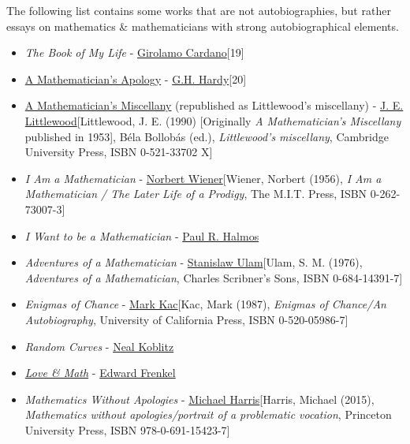 \documentclass{article}
\begin{document}
The following list contains some works that are not autobiographies, but rather essays on mathematics \& mathematicians with strong autobiographical elements.
\begin{itemize}
	\item \textit{The Book of My Life} - \href{https://en.wikipedia.org/wiki/Girolamo_Cardano}{Girolamo Cardano}[19]
	\item \href{https://en.wikipedia.org/wiki/A_Mathematician's_Apology}{A Mathematician's Apology} - \href{https://en.wikipedia.org/wiki/G.H._Hardy}{G.H. Hardy}[20]
	\item \href{https://en.wikipedia.org/wiki/A_Mathematician's_Miscellany}{A Mathematician's Miscellany} (republished as Littlewood's miscellany) - \href{https://en.wikipedia.org/wiki/J._E._Littlewood}{J. E. Littlewood}[Littlewood, J. E. (1990) [Originally \textit{A Mathematician's Miscellany} published in 1953], Béla Bollobás (ed.), \textit{Littlewood's miscellany}, Cambridge University Press, ISBN 0-521-33702 X]
	\item \textit{I Am a Mathematician} - \href{https://en.wikipedia.org/wiki/Norbert_Wiener}{Norbert Wiener}[Wiener, Norbert (1956), \textit{I Am a Mathematician / The Later Life of a Prodigy}, The M.I.T. Press, ISBN 0-262-73007-3]
	\item \textit{I Want to be a Mathematician} - \href{https://en.wikipedia.org/wiki/Paul_R._Halmos}{Paul R. Halmos}
	\item \textit{Adventures of a Mathematician} - \href{https://en.wikipedia.org/wiki/Stanislaw_Ulam}{Stanislaw Ulam}[Ulam, S. M. (1976), \textit{Adventures of a Mathematician}, Charles Scribner's Sons, ISBN 0-684-14391-7]
	\item \textit{Enigmas of Chance} - \href{https://en.wikipedia.org/wiki/Mark_Kac}{Mark Kac}[Kac, Mark (1987), \textit{Enigmas of Chance/An Autobiography}, University of California Press, ISBN 0-520-05986-7]
	\item \textit{Random Curves} - \href{https://en.wikipedia.org/wiki/Neal_Koblitz}{Neal Koblitz}
	\item \href{https://en.wikipedia.org/wiki/Edward_Frenkel#Love_and_Math}{\textit{Love \& Math}} - \href{https://en.wikipedia.org/wiki/Edward_Frenkel}{Edward Frenkel}
	\item \textit{Mathematics Without Apologies} - \href{https://en.wikipedia.org/wiki/Michael_Harris_(mathematician)}{Michael Harris}[Harris, Michael (2015), \textit{Mathematics without apologies/portrait of a problematic vocation}, Princeton University Press, ISBN 978-0-691-15423-7]
\end{itemize}
\end{document}
